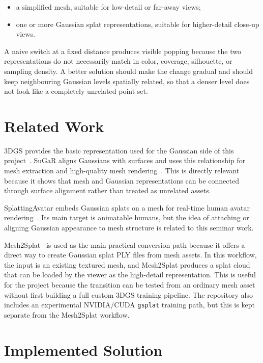 \documentclass{egpubl}
\begin{document}
\begin{itemize}
  \item a simplified mesh, suitable for low-detail or far-away views;
  \item one or more Gaussian splat representations, suitable for higher-detail close-up views.
\end{itemize}

A naive switch at a fixed distance produces visible popping because the two representations do not necessarily match in color,
coverage, silhouette, or sampling density. A better solution should make the change gradual and should keep neighbouring
Gaussian levels spatially related, so that a denser level does not look like a completely unrelated point set.

\section{Related Work}

3DGS provides the basic representation used for the Gaussian side of this project~\cite{kerbl2023gaussian}.
SuGaR aligns Gaussians with surfaces and uses this relationship for mesh extraction and high-quality mesh rendering~\cite{guedon2024sugar}.
This is directly relevant because it shows that mesh and Gaussian representations can be connected through surface alignment
rather than treated as unrelated assets.

SplattingAvatar embeds Gaussian splats on a mesh for real-time human avatar rendering~\cite{shao2024splattingavatar}.
Its main target is animatable humans, but the idea of attaching or aligning Gaussian appearance to mesh structure is
related to this seminar work.

Mesh2Splat~\cite{mesh2splat2025} is used as the main practical conversion path because it offers a direct way to
create Gaussian splat PLY files from mesh assets.
In this workflow, the input is an existing textured mesh, and Mesh2Splat produces a splat cloud that can be loaded
by the viewer as the high-detail representation. This is useful for the project because the transition can be tested
from an ordinary mesh asset without first building a full custom 3DGS training pipeline.
The repository also includes an experimental NVIDIA/CUDA \texttt{gsplat} training path, but this is kept separate from
the Mesh2Splat workflow.

\section{Implemented Solution}
\end{document}
